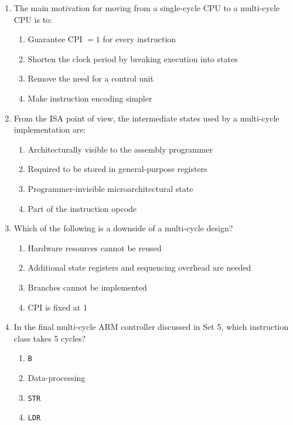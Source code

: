 \documentclass[11pt]{article}
\begin{document}
\begin{enumerate}[label=\textbf{A\arabic*.}]
  \item The main motivation for moving from a single-cycle CPU to a multi-cycle CPU is to:
  \begin{enumerate}[label=(\Alph*)]
    \item Guarantee CPI $= 1$ for every instruction
    \item Shorten the clock period by breaking execution into states
    \item Remove the need for a control unit
    \item Make instruction encoding simpler
  \end{enumerate}

  \item From the ISA point of view, the intermediate states used by a multi-cycle implementation are:
  \begin{enumerate}[label=(\Alph*)]
    \item Architecturally visible to the assembly programmer
    \item Required to be stored in general-purpose registers
    \item Programmer-invisible microarchitectural state
    \item Part of the instruction opcode
  \end{enumerate}

  \item Which of the following is a downside of a multi-cycle design?
  \begin{enumerate}[label=(\Alph*)]
    \item Hardware resources cannot be reused
    \item Additional state registers and sequencing overhead are needed
    \item Branches cannot be implemented
    \item CPI is fixed at 1
  \end{enumerate}

  \item In the final multi-cycle ARM controller discussed in Set 5, which instruction class takes 5 cycles?
  \begin{enumerate}[label=(\Alph*)]
    \item \texttt{B}
    \item Data-processing
    \item \texttt{STR}
    \item \texttt{LDR}
  \end{enumerate}


\end{enumerate}
\end{document}
